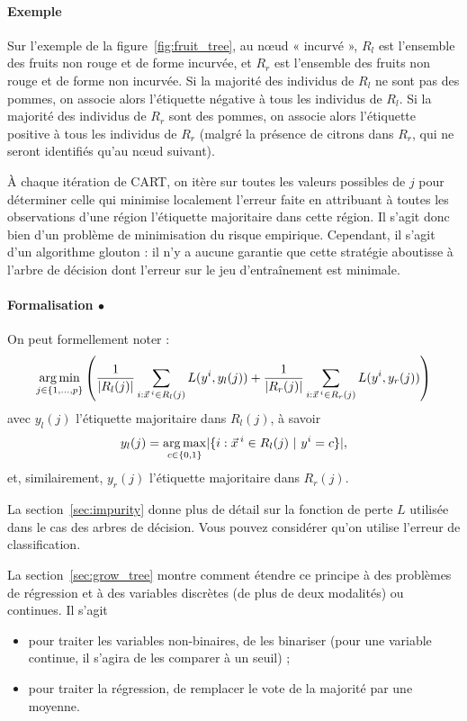\paragraph{Exemple} Sur l'exemple de la figure~\ref{fig:fruit_tree}, au
n{\oe}ud « incurvé », $R_l$ est l'ensemble des fruits non rouge et de forme
incurvée, et $R_r$ est l'ensemble des fruits non rouge et de forme non incurvée. Si
la majorité des individus de $R_l$ ne sont pas des pommes, on associe alors
l'étiquette négative à tous les individus de $R_l$. Si la majorité des
individus de $R_r$ sont des pommes, on associe alors l'étiquette positive à
tous les individus de $R_r$ (malgré la présence de citrons dans $R_r$, qui ne
seront identifiés qu'au n{\oe}ud suivant).

À chaque itération de CART, on itère sur toutes les valeurs possibles de $j$
pour déterminer celle qui minimise localement l'erreur faite en attribuant à
toutes les observations d'une région l'étiquette majoritaire dans cette région.
Il s'agit donc bien d'un problème de minimisation du risque
empirique. Cependant, il s'agit d'un algorithme glouton : il n'y a aucune
garantie que cette stratégie aboutisse à l'arbre de décision dont l'erreur sur
le jeu d'entraînement est minimale.

\paragraph{Formalisation $\bullet$} On peut formellement noter :
\begin{equation}
  \argmin_{j \in \{1, \dots, p\}} \left( 
    \frac1{\abs{R_l(j)}} \sum_{i: \xx^i \in R_l(j)} L(y^i, y_l(j))  + 
     \frac1{\abs{R_r(j)}} \sum_{i: \xx^i \in R_r(j)} L(y^i, y_r(j))
   \right)
   \label{eq:erm_binary_tree}
\end{equation}
avec $y_l(j)$ l'étiquette majoritaire dans $R_l(j)$, à savoir
\begin{equation*}
y_l(j) = \argmax_{c \in \{0, 1\}} \abs{\{i:\xx^i \in R_l(j) ~|~y^i=c\}},
\end{equation*}
et, similairement, 
$y_r(j)$ l'étiquette majoritaire dans $R_r(j)$.

La section~\ref{sec:impurity} donne plus de détail sur la fonction de perte $L$
utilisée dans le cas des arbres de décision. Vous pouvez considérer qu'on
utilise l'erreur de classification.

La section~\ref{sec:grow_tree} montre comment étendre ce principe à des
problèmes de régression et à des variables discrètes (de plus de deux
modalités) ou continues. Il s'agit
\begin{itemize}
\item pour traiter les variables non-binaires, de les binariser (pour une
  variable continue, il s'agira de les comparer à un seuil) ;
\item pour traiter la régression, de remplacer le vote de la majorité par une
  moyenne.
\end{itemize}

